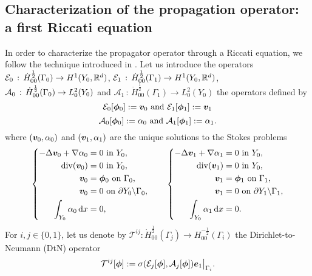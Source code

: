 \documentclass[a4paper,10pt,reqno]{amsart}
\begin{document}
\subsection{Characterization of the propagation operator: a first Riccati equation}
In order to characterize the propagator operator through a Riccati equation, we
follow the technique introduced in \cite{fliss_dirichlet--neumann_2013}. Let us
introduce the operators $\mathcal{E}_0\,:\, \dot{H}^{\frac{1}{2}}_{00}(\Gamma_0)\to H^{1}(Y_0,\mathbb{R}^{d})$, 
$\mathcal{E}_1\,:\,\dot H^{\frac{1}{2}}_{00}(\Gamma_1)\to H^{1}(Y_0,\mathbb{R}^{d})$,   
$\mathcal{A}_0\,:\, \dot{H}^{\frac{1}{2}}_{00}(\Gamma_0)\to L^{2}_0(Y_0)$ and   
$\mathcal{A}_1\,:\, \dot H^{\frac{1}{2}}_{00}(\Gamma_1)\to L^{2}_0(Y_0)$ the
operators defined by    
\begin{equation}
    \label{eqn:2a0sn}\mathcal{E}_0[{\bm \phi}_0]:={\bm v}_0 \text{ and
    }\mathcal{E}_1[{\bm \phi}_1]:={\bm v}_1 
\end{equation}
\begin{equation}
\label{eqn:qywvj}   
\mathcal{A}_0[{\bm \phi}_0]:=\alpha_0 \text{ and }\mathcal{A}_1[{\bm \phi}_1]:=\alpha_1.
\end{equation}
where $({\bm v}_0,\alpha_0)$ and $({\bm v}_1,\alpha_1)$ are the unique solutions to the Stokes
problems
\[
    \left\{\begin{aligned}
    -\Delta  {\bm v}_0 + \nabla \alpha_0 &= 0 \textrm{ in } Y_0,\\  
    \mathrm{div}({\bm v}_0) &= 0 \textrm{ in } Y_0,\\  
    {\bm v}_0 &= \bm\phi_0 \textrm{ on } \Gamma_0,\\    
    {\bm v}_0 &=  0 \textrm{ on } \partial Y_0\backslash\Gamma_0,  \\
    \int_{Y_0}\alpha_0\,\mathrm{d} x &= 0,
    \end{aligned}
    \right.\qquad 
\left\{\begin{aligned}
    -\Delta  {\bm v}_1 + \nabla \alpha_1 &= 0 \textrm{ in } Y_0,\\  
    \mathrm{div}({\bm v}_1) &= 0 \textrm{ in } Y_0,\\  
    {\bm v}_1 &= \bm\phi_1 \textrm{ on } \Gamma_1,\\    
    {\bm v}_1 &=  0 \textrm{ on } \partial Y_1\backslash\Gamma_1,  \\
    \int_{Y_0}\alpha_1\,\mathrm{d} x &= 0.
    \end{aligned}
    \right.
\] 
For $i,j\in\{0,1\}$, let us denote by    
$\mathcal{T}^{ij}:\dot H^{\frac{1}{2}}_{00}(\Gamma_j)\to
H^{-\frac{1}{2}}_{00}(\Gamma_i)$ the Dirichlet-to-Neumann (DtN) operator  
\[
    \mathcal{T}^{ij}[{\bm \phi}]:=\sigma(\mathcal{E}_j[{\bm \phi}],\mathcal{A}_j[{\bm \phi}]){\bm e}_1\big\vert_{\Gamma_i}.
\] 
    
\end{document}
